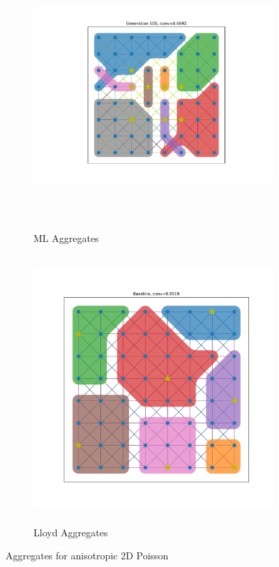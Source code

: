 \documentclass{article}
\begin{document}
\begin{figure}[b]
  \centering
  \begin{subfigure}[b]{0.6\textwidth}
    \centering
    \includegraphics[height=4in, trim=100 0 100 0, clip]{2d_anisotropic_figures/500_agg.pdf}
    \caption{ML Aggregates}
  \end{subfigure}
  \hfill
  \begin{subfigure}[b]{0.6\textwidth}
    \centering
    \includegraphics[height=4in]{2d_anisotropic_figures/baseline.pdf}
    \caption{Lloyd Aggregates}
  \end{subfigure}
  \caption{Aggregates for anisotropic 2D Poisson}
  \label{fig:2d_anisotropic}
\end{figure}
\end{document}
